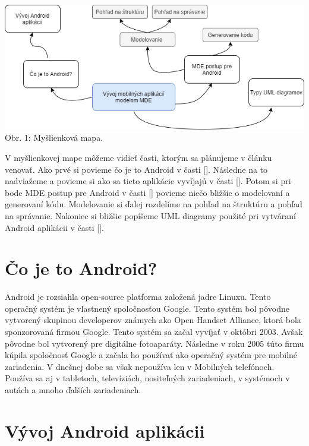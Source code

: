 \documentclass[10pt,twoside,slovak,a4paper]{article}
\begin{document}
\begin{center}
\includegraphics[scale=0.51]{myšlienková mapa.png}
Obr. 1: Myšlienková mapa.
\end{center}
V myšlienkovej mape môžeme vidieť časti, ktorým sa plánujeme v článku venovať. Ako prvé si povieme čo je to Android v časti []. Následne na to nadviažeme a povieme si ako sa tieto aplikácie vyvíjajú v časti []. 
Potom si pri bode MDE postup pre Android v časti [] povieme niečo bližšie o modelovaní a generovaní kódu. Modelovanie si ďalej rozdelíme na pohľad na štruktúru a pohľad na správanie. Nakoniec si bližšie popíšeme UML diagramy použité pri vytváraní Android aplikácii v časti [].


\section{Čo je to Android?} \label{Čo je to Android?}
Android je rozsiahla open-source platforma založená jadre Linuxu. Tento operačný systém je vlastnený spoločnosťou Google. Tento systém bol pôvodne vytvorený skupinou developerov známych ako Open Handset Alliance, ktorá bola sponzorovaná firmou Google. \newline
Tento systém sa začal vyvíjať v októbri 2003. Avšak pôvodne bol vytvorený pre digitálne fotoaparáty. Následne v roku 2005 túto firmu kúpila spoločnosť Google a začala ho používať ako operačný systém pre mobilné zariadenia. \newline
V dnešnej dobe sa však nepoužíva len v  Mobilných telefónoch. Používa sa aj v tabletoch, televíziách, nositeľných zariadeniach, v systémoch v autách a mnoho ďalších zariadeniach.



\section{Vývoj Android aplikácii } \label{Vývoj Android aplikácii}
\end{document}
